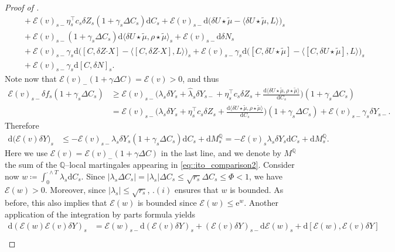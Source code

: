 \documentclass[10pt]{article} %
\newcommand\cE{\mathcal E}
\def \Q{\mathbb{Q}}
\newcommand{\bcdot}{\boldsymbol{\cdot}}
\newcommand{\1}{\mathbf{1}}
\def\d{\mathrm{d}}
\begin{document}
\begin{proof}[Proof of ]
\begin{align}
		&\quad + \cE(v)_{s-} \eta^\top_s c_s\delta Z_s (1+\gamma_s\Delta C_s) \d C_s + \cE(v)_{s-}\d\big(\delta U \star \tilde\mu - \langle \delta U \star\tilde\mu,L\rangle\big)_s \nonumber\\
		&\quad + \cE(v)_{s-}(1+\gamma_s \Delta C_s)\d \langle \delta U \star\tilde\mu,\rho\star\tilde\mu\rangle_s  + \cE(v)_{s-}\d \delta N_s \nonumber\\
		&\quad + \cE(v)_{s-}\gamma_s \d\big([C,\delta Z \bcdot X]-\big\langle [C,\delta Z \bcdot X],L \big\rangle\big)_s + \cE(v)_{s-}\gamma_s \d\big([C,\delta U \star\tilde\mu]-\big\langle [C,\delta U \star\tilde\mu],L \big\rangle\big)_s \nonumber\\
		&\quad + \cE(v)_{s-}\gamma_s \d [C,\delta N]_s.
	\end{align}
	Note now that $\cE(v)_{-}(1+\gamma\Delta C) = \cE(v) > 0$, and thus
	\begin{align*}
		\cE(v)_{s-}\delta f_s(1+\gamma_s\Delta C_s) 
		&\geq \cE(v)_{s-}\bigg(\lambda_s\delta Y_s + \widehat\lambda_s\delta Y_{s-} + \eta^\top_s c_s \delta Z_s + \frac{\d\langle \delta U \star\tilde\mu, \rho\star\tilde\mu\rangle}{\d C_s}\bigg)(1+\gamma_s\Delta C_s) \\
		&= \cE(v)_{s-}\bigg(\lambda_s\delta Y_s + \eta^\top_s c_s \delta Z_s + \frac{\d\langle \delta U \star\tilde\mu, \rho\star\tilde\mu\rangle}{\d C_s}\bigg)(1+\gamma_s\Delta C_s) + \cE(v)_{s-}\gamma_s\delta Y_{s-}.
	\end{align*}
	Therefore
	\begin{align*}
		\d \big(\cE(v)\delta Y\big)_s 
		& \leq - \cE(v)_{s-}\lambda_s \delta Y_s (1+\gamma_s\Delta C_s) \d C_s + \d M^\Q_s  = - \cE(v)_s\lambda_s \delta Y_s \d C_s + \d M^\Q_s.
	\end{align*}
	Here we use $\cE(v) = \cE(v)_-(1+\gamma\Delta C)$ in the last line, and we denote by $M^\Q$ the sum of the $\Q$--local martingales appearing in \eqref{eq::ito_comparison2}. Consider now $w \coloneqq \int_0^{\cdot \land T} \lambda_s \d C_s$. Since $|\lambda_s \Delta C_s| = |\lambda_s|\Delta C_s \leq \sqrt{r_s} \Delta C_s \leq \Phi < 1$, we have $\cE(w) > 0$. Moreover, since $|\lambda_s| \leq \sqrt{r_s}$, .$(i)$ ensures that $w$ is bounded. As before, this also implies that $\cE(w)$ is bounded since $\cE(w)\leq\mathrm{e}^w$. Another application of the integration by parts formula yields
	\begin{align*}
		\d (\cE(w)\cE(v)\delta Y)_s 
		&= \cE(w)_{s-}\d (\cE(v)\delta Y)_s + (\cE(v)\delta Y)_{s-}\d \cE(w)_s + \d [\cE(w),\cE(v)\delta Y] \\

\end{align*}
\end{proof}
\end{document}
